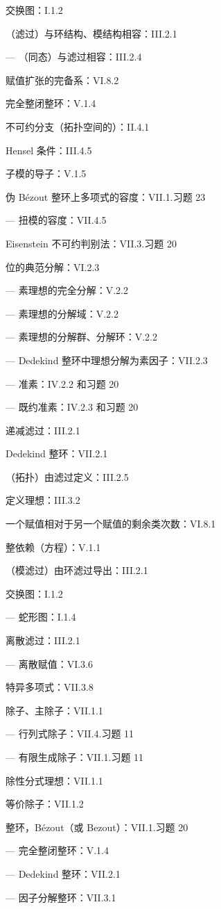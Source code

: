交换图：I.1.2

（滤过）与环结构、模结构相容：III.2.1

--- （同态）与滤过相容：III.2.4

赋值扩张的完备系：VI.8.2

完全整闭整环：V.1.4

不可约分支（拓扑空间的）：II.4.1

Hensel 条件：III.4.5

子模的导子：V.1.5

伪 Bézout 整环上多项式的容度：VII.1.习题 23

--- 扭模的容度：VII.4.5

Eisenstein 不可约判别法：VII.3.习题 20

位的典范分解：VI.2.3

--- 素理想的完全分解：V.2.2

--- 素理想的分解域：V.2.2

--- 素理想的分解群、分解环：V.2.2

--- Dedekind 整环中理想分解为素因子：VII.2.3

--- 准素：IV.2.2 和习题 20

--- 既约准素：IV.2.3 和习题 20

递减滤过：III.2.1

Dedekind 整环：VII.2.1

（拓扑）由滤过定义：III.2.5

定义理想：III.3.2

一个赋值相对于另一个赋值的剩余类次数：VI.8.1

整依赖（方程）：V.1.1

（模滤过）由环滤过导出：III.2.1

交换图：I.1.2

--- 蛇形图：I.1.4

离散滤过：III.2.1

--- 离散赋值：VI.3.6

特异多项式：VII.3.8

除子、主除子：VII.1.1

--- 行列式除子：VII.4.习题 11

--- 有限生成除子：VII.1.习题 11

除性分式理想：VII.1.1

等价除子：VII.1.2

整环，Bézout（或 Bezout）：VII.1.习题 20

--- 完全整闭整环：V.1.4

--- Dedekind 整环：VII.2.1

--- 因子分解整环：VII.3.1

